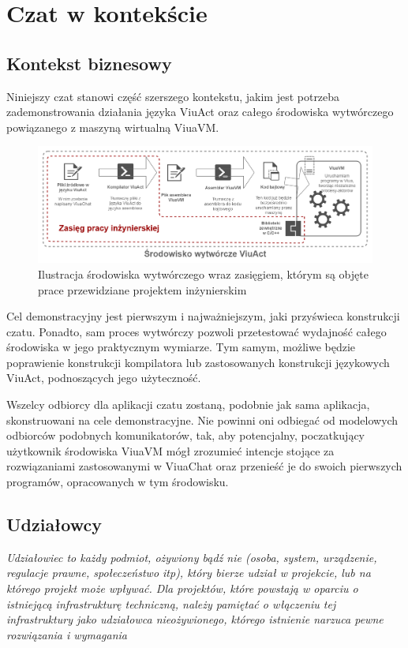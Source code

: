 \documentclass[11pt,oneside,a4paper,titlepage,onecolumn]{article}
\begin{document}
\section{Czat w kontekście}

\subsection{Kontekst biznesowy}

Niniejszy czat stanowi część szerszego kontekstu, jakim jest potrzeba zademonstrowania działania języka ViuAct oraz całego środowiska wytwórczego powiązanego z maszyną wirtualną ViuaVM.

\begin{figure}[h]
	\centering
	\includegraphics[width=\textwidth]{viuavm-env}
	\caption{Ilustracja środowiska wytwórczego wraz zasięgiem, którym są objęte prace przewidziane projektem inżynierskim}
\end{figure}

Cel demonstracyjny jest pierwszym i najważniejszym, jaki przyświeca konstrukcji czatu. Ponadto, sam proces wytwórczy pozwoli
przetestować wydajność całego środowiska w jego praktycznym wymiarze. Tym samym, możliwe będzie poprawienie konstrukcji kompilatora 
lub zastosowanych konstrukcji językowych ViuAct, podnoszących jego użyteczność.

Wszelcy odbiorcy dla aplikacji czatu zostaną, podobnie jak sama aplikacja, skonstruowani na cele demonstracyjne. Nie powinni oni
odbiegać od modelowych odbiorców podobnych komunikatorów, tak, aby potencjalny, poczatkujący użytkownik środowiska ViuaVM mógł
zrozumieć intencje stojące za rozwiązaniami zastosowanymi w ViuaChat oraz przenieść je do swoich pierwszych programów, opracowanych
w tym środowisku.

\subsection{Udziałowcy}
\textit{Udziałowiec to każdy podmiot, ożywiony bądź nie (osoba, system, urządzenie, regulacje prawne, społeczeństwo itp), który bierze udział w projekcie, lub na którego projekt może wpływać.
Dla projektów, które powstają w oparciu o istniejącą infrastrukturę techniczną, należy pamiętać o włączeniu tej infrastruktury jako udziałowca nieożywionego, którego istnienie narzuca pewne rozwiązania i wymagania}
\end{document}
